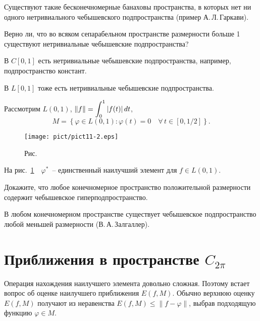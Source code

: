 \begin{Remark}
Существуют такие бесконечномерные банаховы пространства, в которых нет
ни одного нетривиального чебышевского подпространства (пример
А.\,Л.\,Гаркави).
\end{Remark}

\begin{task}
Верно ли, что во всяком сепарабельном пространстве размерности больше 1
существуют нетривиальные чебышевские подпространства?
\end{task}

В $C[0,1]$ есть нетривиальные чебышевские подпространства, например,
подпространство констант.

В $L[0,1]$ тоже есть нетривиальные чебышевские подпространства.

\begin{Example}
Рассмотрим $L(0,1)$, $\|f\|=\displaystyle\int_0^1 |f(t)|\,dt$,
$$
M=\left\{\varphi\in L(0,1)\colon \varphi(t)=0\quad\forall\, t\in [0,1/2]\right\}.
$$

 \bigskip
\begin{figure}[ht]
\begin{center}
\texttt{[image: pict/pict11-2.eps]}
\end{center}
 \bigskip
 \label{r11-2}

 \centerline{Рис.~\theris}
 \bigskip
\end{figure}

\noindent На рис.~\ref{r11-2}\ \ $\varphi^*$~-- единственный наилучший элемент
для $f \in L(0,1).$
\end{Example}

\begin{task}
Докажите, что любое конечномерное пространство положительной
размерности содержит чебышевское гиперподпространство.
\end{task}

\begin{Remark}
В любом конечномерном пространстве существует чебышевское подпространство
любой меньшей размерности (В.\,А.\,Залгаллер).
\end{Remark}


\section{Приближения в пространстве $C_{2\pi}$}

Операция нахождения наилучшего элемента довольно сложная. Поэтому
встает вопрос об оценке наилучшего приближения $E(f,M)$. Обычно
верхнюю оценку $E(f,M)$ получают из неравенства
$E(f,M) \le \|f-\varphi\|$, выбрав подходящую функцию $\varphi\in
M$.

